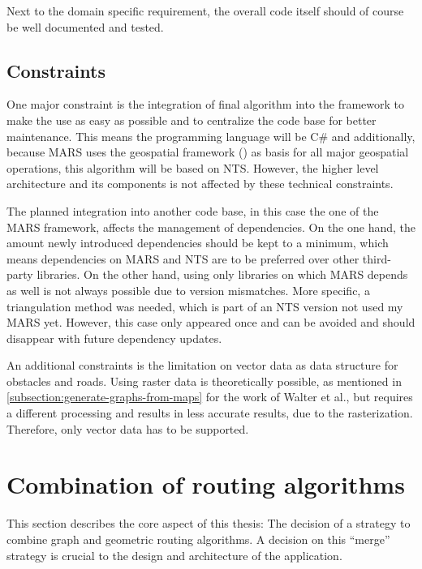 		Next to the domain specific requirement, the overall code itself should of course be well documented and tested.
	
	\subsection{Constraints}
	\label{subsec:constraints}
		
		One major constraint is the integration of final algorithm into the  framework to make the use as easy as possible and to centralize the code base for better maintenance.
		This means the programming language will be C\# and additionally, because MARS uses the geospatial framework  () as basis for all major geospatial operations, this algorithm will be based on NTS.
		However, the higher level architecture and its components is not affected by these technical constraints.
		
		The planned integration into another code base, in this case the one of the MARS framework, affects the management of dependencies.
		On the one hand, the amount newly introduced dependencies should be kept to a minimum, which means dependencies on MARS and NTS are to be preferred over other third-party libraries.
		On the other hand, using only libraries on which MARS depends as well is not always possible due to version mismatches.
		More specific, a triangulation method was needed, which is part of an NTS version not used my MARS yet.
		However, this case only appeared once and can be avoided and should disappear with future dependency updates.
		
		An additional constraints is the limitation on vector data as data structure for obstacles and roads.
		Using raster data is theoretically possible, as mentioned in \cref{subsection:generate-graphs-from-maps} for the work of Walter et al., but requires a different processing and results in less accurate results, due to the rasterization.
		Therefore, only vector data has to be supported.
	
\section{Combination of routing algorithms}
\label{sec:combining-routing-algorithms}

	This section describes the core aspect of this thesis:
	The decision of a strategy to combine graph and geometric routing algorithms.
	A decision on this \enquote{merge} strategy is crucial to the design and architecture of the application.
	
